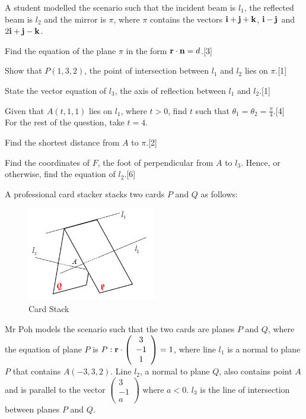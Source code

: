 \documentclass[12pt, a4 paper]{article}
\begin{document}
\begin{outline}[enumerate]
	A student modelled the scenario such that the incident beam is ${l_1}$, the reflected beam is ${l_2}$ and the mirror is $\pi $, where $\pi $ contains the vectors ${\bf{i}} + {\bf{j}} + {\bf{k}}$, ${\bf{i}} - {\bf{j}}$ and $2{\bf{i}} + {\bf{j}} - {\bf{k}}$.

	\2 Find the equation of the plane $\pi $ in the form ${\bf{r}} \cdot {\bf{n}} = d$.\hfill[3]

	\2	Show that $P(1,3,2)$, the point of intersection between ${l_1}$ and ${l_2}$ lies on $\pi $.\hfill[1]

	\2	State the vector equation of ${l_3}$, the axis of reflection between ${l_1}$ and ${l_2}$.\hfill[1]

	\2	Given that $A(t,1,1)$ lies on ${l_1}$, where $t > 0$, find $t$ such that ${\theta _1} = {\theta _2} = \frac{\pi }{4}$.\hfill[4]	\\

	For the rest of the question, take $t = 4$.

	\2	Find the shortest distance from $A$ to $\pi $.\hfill[2]

	\2	Find the coordinates of $F$, the foot of perpendicular from $A$ to ${l_3}$. Hence, or otherwise, find the equation of ${l_2}$.\hfill[6]\\

	\newpage

	\1 A professional card stacker stacks two cards $P$ and $Q$ as follows:
	\begin{figure}[h]
		\centering
		\includegraphics[width=0.5\textwidth]{vectors_tent}
		\caption{Card Stack}
	\end{figure}

	Mr Poh models the scenario such that the two cards are planes $P$ and $Q$, where the equation of plane $P$ is $P:{\bf{r}} \cdot \left( {\begin{array}{*{20}{c}}3\\{ - 1}\\1\end{array}} \right) = 1$, where line ${l_1}$ is a normal to plane $P$ that contains $A( - 3,3,2)$. Line ${l_2}$, a normal to plane $Q$, also contains point $A$ and is parallel to the vector $\left( {\begin{array}{*{20}{c}}3\\{ - 1}\\a\end{array}} \right)$ where $a < 0$. ${l_3}$ is the line of intersection between planes $P$ and $Q$.


\end{outline}
\end{document}

